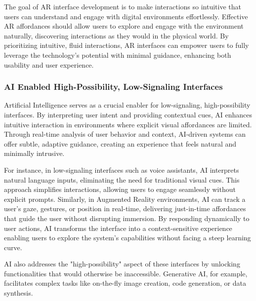 The goal of AR interface development is to make interactions so intuitive that users can understand and engage with digital environments effortlessly.%
 Effective AR affordances should allow users to explore and engage with the environment naturally, discovering interactions as they would in the physical world.
By prioritizing intuitive, fluid interactions, AR interfaces can empower users to fully leverage the technology’s potential with minimal guidance, enhancing both usability and user experience.

\subsubsection{ AI Enabled High-Possibility, Low-Signaling Interfaces}

Artificial Intelligence serves as a crucial enabler for low-signaling, high-possibility interfaces\cite{neches1986intelligence}.
By interpreting user intent and providing contextual cues, AI enhances intuitive interaction in environments where explicit visual affordances are limited\cite{9820378}.
Through real-time analysis of user behavior and context, AI-driven systems can offer subtle, adaptive guidance, creating an experience that feels natural and minimally intrusive.

For instance, in low-signaling interfaces such as voice assistants, AI interprets natural language inputs, eliminating the need for traditional visual cues.
This approach simplifies interactions, allowing users to engage seamlessly without explicit prompts.
Similarly, in Augmented Reality environments, AI can track a user’s gaze, gestures, or position in real-time, delivering just-in-time affordances that guide the user without disrupting immersion.
By responding dynamically to user actions, AI transforms the interface into a context-sensitive experience enabling users to explore the system’s capabilities without facing a steep learning curve.%

AI also addresses the "high-possibility" aspect of these interfaces by unlocking functionalities that would otherwise be inaccessible.
Generative AI, for example, facilitates complex tasks like on-the-fly image creation, code generation, or data synthesis.%

